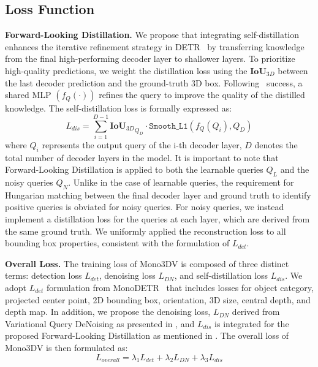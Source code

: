 \subsection{Loss Function}
\textbf{Forward-Looking Distillation.} We propose that integrating self-distillation enhances the iterative refinement strategy in DETR~\cite{DETR} by transferring knowledge from the final high-performing decoder layer to shallower layers. To prioritize high-quality predictions, we weight the distillation loss using the $\mathbf{IoU}_{3D}$ between the last decoder prediction and the ground-truth 3D box. Following~\cite{SD} success, a shared MLP $\left(f_Q\left(\cdot\right)\right)$ refines the query to improve the quality of the distilled knowledge. The self-distillation loss is formally expressed as:
\begin{equation}
    L_{dis} = \sum_{i=1}^{D-1}{\mathbf{IoU}_{3D}}_{Q_D}\cdot \texttt{Smooth\_L1}\left(f_Q\left(Q_i\right), Q_D\right)
    \label{eq:loss_dis}
\end{equation}
where $Q_i$ represents the output query of the i-th decoder layer, $D$ denotes the total number of decoder layers in the model. It is important to note that Forward-Looking Distillation is applied to both the learnable queries $Q_L$ and the noisy queries $Q_N$. Unlike in the case of learnable queries, the requirement for Hungarian matching between the final decoder layer and ground truth to identify positive queries is obviated for noisy queries. For noisy queries, we instead implement a distillation loss for the queries at each layer, which are derived from the same ground truth. We uniformly applied the reconstruction loss to all bounding box properties, consistent with the formulation of $L_{det}$.

\noindent\textbf{Overall Loss.} The training loss of Mono3DV is composed of three distinct terms: detection loss $L_{det}$, denoising loss $L_{DN}$, and self-distillation loss $L_{dis}$. We adopt $L_{det}$ formulation from MonoDETR~\cite{MonoDETR} that includes losses for object category, projected center point, 2D bounding box, orientation, 3D size, central depth, and depth map. In addition, we propose the denoising loss, $L_{DN}$ derived from Variational Query DeNoising as presented in , and $L_{dis}$ is integrated for the proposed Forward-Looking Distillation as mentioned in . The overall loss of Mono3DV is then formulated as:
\begin{equation}
    L_{overall} = \lambda_1L_{det}+ \lambda_{2}L_{DN}+ \lambda_{3}L_{dis}
    \label{eq:overall_loss}
\end{equation}

